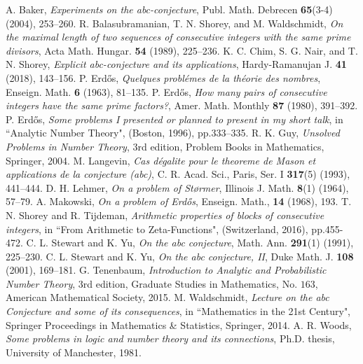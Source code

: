 \documentclass{article}
\theoremstyle{plain}
\theoremstyle{definition}
\begin{document}
\begin{thebibliography}{99}
 A. Baker, \emph{Experiments on the abc-conjecture}, Publ. Math. Debrecen {\bf 65}(3-4) (2004), 253--260.
 R. Balasubramanian, T. N. Shorey, and M. Waldschmidt, \emph{On the maximal length of two sequences of consecutive integers with the same prime divisors}, Acta Math. Hungar. {\bf 54} (1989), 225--236.
 K. C. Chim, S. G. Nair, and T. N. Shorey, \emph{Explicit abc-conjecture and its applications}, Hardy-Ramanujan J. {\bf 41} (2018), 143--156.
 P. Erd{\H o}s, \emph{Quelques probl{\' e}mes de la th{\' e}orie des nombres}, Enseign. Math. {\bf 6} (1963), 81--135.
 P. Erd{\H o}s, \emph{How many pairs of consecutive integers have the same prime factors?}, Amer. Math. Monthly {\bf 87} (1980), 391--392.
 P. Erd{\H o}s, \emph{Some problems I presented or planned to present in my short talk}, in ``Analytic Number Theory", (Boston, 1996), pp.333--335.
 R. K. Guy, \emph{Unsolved Problems in Number Theory}, 3rd edition, Problem Books in Mathematics, Springer, 2004.
 M. Langevin, \emph{Cas d{\' e}galite pour le theoreme de Mason et applications de la conjecture (abc)}, C. R. Acad. Sci., Paris, Ser. I {\bf 317}(5) (1993), 441--444.
 D. H. Lehmer, \emph{On a problem of St\o rmer}, Illinois J. Math. {\bf 8}(1) (1964), 57--79.
 A. Makowski, \emph{On a problem of Erd{\H o}s}, Enseign. Math., {\bf 14} (1968), 193.
 T. N. Shorey and R. Tijdeman, \emph{Arithmetic properties of blocks of consecutive integers}, in ``From Arithmetic to Zeta-Functions", (Switzerland, 2016), pp.455-472.
 C. L. Stewart and K. Yu, \emph{On the abc conjecture}, Math. Ann. {\bf 291}(1) (1991), 225--230.
 C. L. Stewart and K. Yu, \emph{On the abc conjecture, II}, Duke Math. J. {\bf 108} (2001), 169--181.
 G. Tenenbaum, \emph{Introduction to Analytic and Probabilistic Number Theory}, 3rd edition, Graduate Studies in Mathematics, No. $163$, American Mathematical Society, 2015.
 M. Waldschmidt, \emph{Lecture on the abc Conjecture and some of its consequences}, in ``Mathematics in the 21st Century", Springer Proceedings in Mathematics \& Statistics, Springer, 2014.
 A. R. Woods, \emph{Some problems in logic and number theory and its connections}, Ph.D. thesis, University of Manchester, 1981.
\end{thebibliography}
\end{document}
